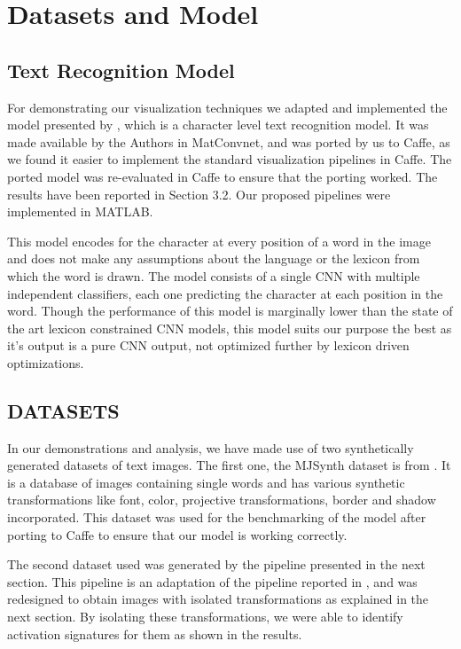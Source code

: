 \documentclass[10pt,twocolumn,letterpaper]{article}
\begin{document}
\section{Datasets and Model}


\subsection{Text Recognition Model}
For demonstrating our visualization techniques we adapted and implemented the model presented by \cite{Jaderberg14c}, which is a character level text recognition model. It was made available by the Authors in MatConvnet, and was ported by us to Caffe, as we found it easier to implement the standard visualization pipelines in Caffe. The ported model was re-evaluated in Caffe to ensure that the porting worked. The results have been reported in Section 3.2. Our proposed pipelines were implemented in MATLAB.


This model encodes for the character at every position of a word in the image and does not make any assumptions about the language or the lexicon from which the word is drawn. The model consists of a single CNN with multiple independent classifiers, each one predicting the character at each position in the word. Though the performance of this model is marginally lower than the state of the art lexicon constrained CNN models, this model suits our purpose the best as it's output is a pure CNN output, not optimized further by lexicon driven optimizations. 


\subsection{DATASETS}
In our demonstrations and analysis, we have made use of two synthetically generated datasets of text images. The first one, the MJSynth dataset is from \cite{Jaderberg14c}. It is a database of images containing single words and has various synthetic transformations like font, color, projective transformations, border and shadow incorporated. This dataset was used for the benchmarking of the model after porting to Caffe to ensure that our model is working correctly.


The second dataset used was generated by the pipeline presented in the next section. This pipeline is an adaptation of the pipeline reported in \cite{Gupta16}, and was redesigned to obtain images with isolated transformations as explained in the next section. By isolating these transformations, we were able to identify activation signatures for them as shown in the results.
\end{document}
